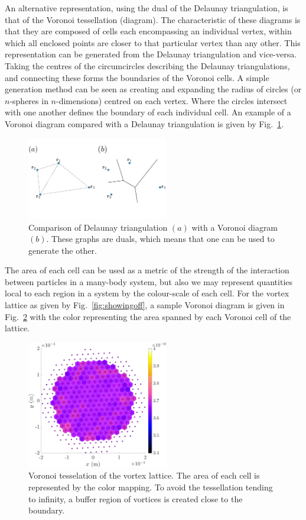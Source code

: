 An alternative representation, using the dual of the Delaunay triangulation, is that of the Voronoi tessellation (diagram). The characteristic of these diagrams is that they are composed of cells each encompassing an individual vertex, within which all enclosed points are closer to that particular vertex than any other. This representation can be generated from the Delaunay triangulation and vice-versa. Taking the centres of the circumcircles describing the Delaunay triangulations, and connecting these forms the boundaries of the Voronoi cells. A simple generation method can be seen as creating and expanding the radius of circles (or $n$-spheres in $n$-dimensions) centred on each vertex. Where the circles intersect with one another defines the boundary of each individual cell. An example of a Voronoi diagram compared with a Delaunay triangulation is given by Fig.~\ref{fig:Voronoi}.
\begin{figure}\centering
    \includegraphics[width=0.55\textwidth]{Images/ch4_vtx/voronoi}
    \caption{Comparison of Delaunay triangulation $(a)$ with a Voronoi diagram $(b)$. These graphs are duals, which means that one can be used to generate the other.}\label{fig:Voronoi}
\end{figure}
The area of each cell can be used as a metric of the strength of the interaction between particles in a many-body system, but also we may represent quantities local to each region in a system by the colour-scale of each cell. For the vortex lattice as given by Fig.~\ref{fig:showingoff}, a sample Voronoi diagram is given in Fig.~\ref{fig:voron_vtxlatt} with the color representing the area spanned by each Voronoi cell of the lattice.

\begin{figure}\centering
    \includegraphics[width=0.55\textwidth]{Images/ch4_vtx/Voronoi_area_VTXLATT}
    \caption{Voronoi tesselation of the vortex lattice. The area of each cell is represented by the color mapping. To avoid the tessellation tending to infinity, a buffer region of vortices is created close to the boundary. }\label{fig:voron_vtxlatt}
\end{figure}
